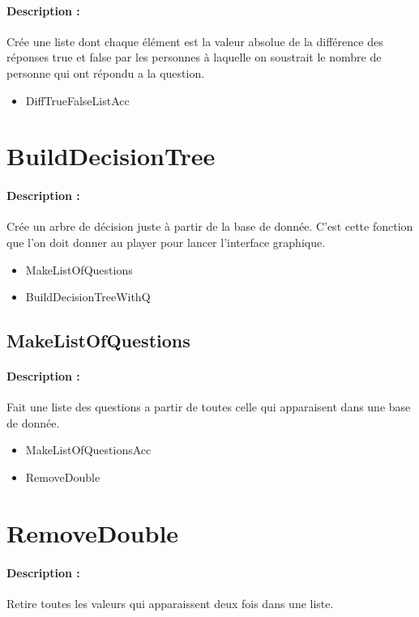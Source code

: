 \documentclass[10pt,a4paper]{article}
\begin{document}
\paragraph{Description :} Crée une liste dont chaque élément est la valeur absolue de la différence des réponses true et false par les personnes à laquelle on soustrait le nombre de personne qui ont répondu a la question.

\begin{itemize}
\item DiffTrueFalseListAcc
\end{itemize}

\section{BuildDecisionTree}
\paragraph{Description :} Crée un arbre de décision juste à partir de la base de donnée. C'est cette fonction que l'on doit donner  au player pour lancer l'interface graphique.

\begin{itemize}
\item MakeListOfQuestions
\item BuildDecisionTreeWithQ
\end{itemize}

\subsection{MakeListOfQuestions}
\paragraph{Description :} Fait une liste des questions a partir de toutes celle qui apparaisent dans une base de donnée.

\begin{itemize}
\item MakeListOfQuestionsAcc
\item RemoveDouble
\end{itemize}

\section{RemoveDouble}
\paragraph{Description :} Retire toutes les valeurs qui apparaissent deux fois dans une liste.
\end{document}
